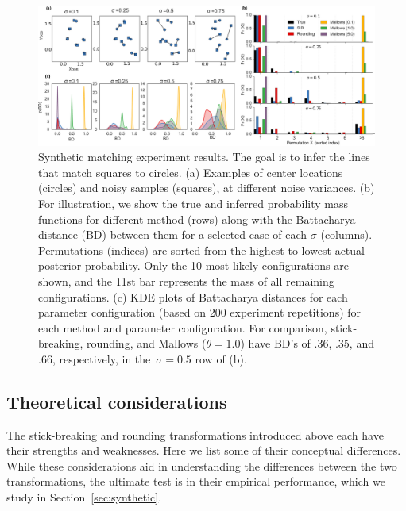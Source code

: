 \documentclass[twoside]{article}
\begin{document}
\begin{figure}[ht] 
   \centering
   \includegraphics[width=6in]{../figures/figure8.pdf}
   \caption{Synthetic matching experiment results. The goal is to
     infer the lines that match squares to circles. (a) Examples of
     center locations (circles) and noisy samples (squares), at
     different noise variances. (b) For illustration, we show the true
     and inferred probability mass functions for different method
     (rows) along with the Battacharya distance (BD) between them for
     a selected case of each $\sigma$ (columns). Permutations
     (indices) are sorted from the highest to lowest actual posterior
     probability. Only the 10 most likely configurations are shown,
     and the 11st bar represents the mass of all remaining
     configurations. (c) KDE plots of Battacharya distances for each
     parameter configuration (based on 200 experiment repetitions) for
     each method and parameter configuration.  For comparison,
     stick-breaking, rounding, and Mallows ($\theta = 1.0$) have BD's
     of .36, .35, and .66, respectively, in the~$\sigma = 0.5$ row of
     (b).}
   \label{fig:synthetic}
\end{figure}

\subsection{Theoretical considerations}
\label{sec:considerations}

The stick-breaking and rounding transformations introduced above each
have their strengths and weaknesses.  Here we list some of their
conceptual differences.  While these considerations aid in
understanding the differences between the two transformations, the
ultimate test is in their empirical performance, which we study in
Section~\ref{sec:synthetic}.
\end{document}
